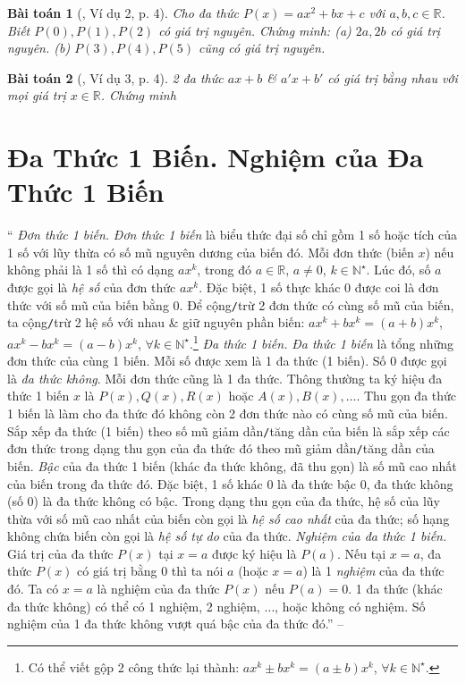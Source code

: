 \documentclass{article}
\newtheorem{baitoan}{Bài toán}
\begin{document}
\begin{baitoan}[\cite{Binh_Toan_7_tap_2}, Ví dụ 2, p. 4]
	Cho đa thức $P(x) = ax^2 + bx + c$ với $a,b,c\in\mathbb{R}$. Biết $P(0),P(1),P(2)$ có giá trị nguyên. Chứng minh: (a) $2a,2b$ có giá trị nguyên. (b) $P(3),P(4),P(5)$ cũng có giá trị nguyên.
\end{baitoan}

\begin{baitoan}[\cite{Binh_Toan_7_tap_2}, Ví dụ 3, p. 4]
	2 đa thức $ax + b$ \& $a'x + b'$ có giá trị bằng nhau với mọi giá trị $x\in\mathbb{R}$. Chứng minh 
\end{baitoan}


\section{Đa Thức 1 Biến. Nghiệm của Đa Thức 1 Biến}
`` \textit{Đơn thức 1 biến.} \textit{Đơn thức 1 biến} là biểu thức đại số chỉ gồm 1 số hoặc tích của 1 số với lũy thừa có số mũ nguyên dương của biến đó. Mỗi đơn thức (biến $x$) nếu không phải là 1 số thì có dạng $ax^k$, trong đó $a\in\mathbb{R}$, $a\ne0$, $k\in\mathbb{N}^\star$. Lúc đó, số $a$ được gọi là \textit{hệ số} của đơn thức $ax^k$. Đặc biệt, 1 số thực khác $0$ được coi là đơn thức với số mũ của biến bằng $0$. Để cộng\texttt{/}trừ 2 đơn thức có cùng số mũ của biến, ta cộng\texttt{/}trừ 2 hệ số với nhau \& giữ nguyên phần biến: $ax^k + bx^k = (a + b)x^k$, $ax^k - bx^k = (a - b)x^k$, $\forall k\in\mathbb{N}^\star$.\footnote{Có thể viết gộp 2 công thức lại thành: $ax^k\pm bx^k = (a\pm b)x^k$, $\forall k\in\mathbb{N}^\star$.}  \textit{Đa thức 1 biến.} \textit{Đa thức 1 biến} là tổng những đơn thức của cùng 1 biến. Mỗi số được xem là 1 đa thức (1 biến). Số $0$ được gọi là \textit{đa thức không}. Mỗi đơn thức cũng là 1 đa thức. Thông thường ta ký hiệu đa thức 1 biến $x$ là $P(x),Q(x),R(x)$ hoặc $A(x),B(x),\ldots$. Thu gọn đa thức 1 biến là làm cho đa thức đó không còn 2 đơn thức nào có cùng số mũ của biến. Sắp xếp đa thức (1 biến) theo số mũ giảm dần\texttt{/}tăng dần của biến là sắp xếp các đơn thức trong dạng thu gọn của đa thức đó theo mũ giảm dần\texttt{/}tăng dần của biến. \textit{Bậc} của đa thức 1 biến (khác đa thức không, đã thu gọn) là số mũ cao nhất của biến trong đa thức đó. Đặc biệt, 1 số khác 0 là đa thức bậc 0, đa thức không (số 0) là đa thức không có bậc. Trong dạng thu gọn của đa thức, hệ số của lũy thừa với số mũ cao nhất của biến còn gọi là \textit{hệ số cao nhất} của đa thức; số hạng không chứa biến còn gọi là \textit{hệ số tự do} của đa thức.  \textit{Nghiệm của đa thức 1 biến.} Giá trị của đa thức $P(x)$ tại $x = a$ được ký hiệu là $P(a)$. Nếu tại $x = a$, đa thức $P(x)$ có giá trị bằng $0$ thì ta nói $a$ (hoặc $x = a$) là 1 \textit{nghiệm} của đa thức đó. Ta có $x = a$ là nghiệm của đa thức $P(x)$ nếu $P(a) = 0$. 1 đa thức (khác đa thức không) có thể có 1 nghiệm, 2 nghiệm, $\ldots$, hoặc không có nghiệm. Số nghiệm của 1 đa thức không vượt quá bậc của đa thức đó.'' -- \cite[Chap. VI, \S2, pp. 40--41]{SBT_Toan_7_Canh_Dieu_tap_2}
\end{document}
